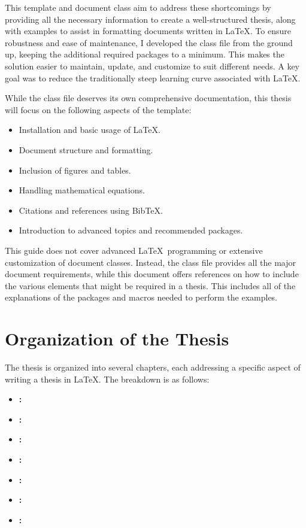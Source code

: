 		This template and document class aim to address these shortcomings by providing all the necessary information to create a well-structured thesis, along with examples to assist in formatting documents written in \LaTeX.
		To ensure robustness and ease of maintenance, I developed the class file from the ground up, keeping the additional required packages to a minimum.
		This makes the solution easier to maintain, update, and customize to suit different needs.
		A key goal was to reduce the traditionally steep learning curve associated with \LaTeX.
		
		While the class file deserves its own comprehensive documentation, this thesis will focus on the following aspects of the template:
		\begin{itemize}
			\item Installation and basic usage of \LaTeX.
			\item Document structure and formatting.
			\item Inclusion of figures and tables.
			\item Handling mathematical equations.
			\item Citations and references using BibTeX.
			\item Introduction to advanced topics and recommended packages.
		\end{itemize}

		This guide does not cover advanced \LaTeX\ programming or extensive customization of document classes.
		Instead, the class file  provides all the major document requirements, while this document offers references on how to include the various elements that might be required in a thesis.
		This includes all of the explanations of the packages and macros needed to perform the examples.

	\section{Organization of the Thesis}
		The thesis is organized into several chapters, each addressing a specific aspect of writing a thesis in \LaTeX. 
		The breakdown is as follows:
		\begin{itemize}
			\item \textbf{:}  
			\item \textbf{:}  
			\item \textbf{:}  
			\item \textbf{:}  
			\item \textbf{:}  
			\item \textbf{:}  
			\item \textbf{:}  
		\end{itemize}

